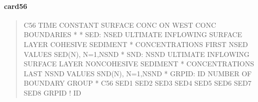 \documentclass[letterpaper,10pt,english]{sphinxmanual}
\begin{document}
\paragraph{card56}
\label{\detokenize{inputfiles/runcontrol/card56:card56}}\label{\detokenize{inputfiles/runcontrol/card56::doc}}\begin{quote}

\begin{sphinxVerbatim}[commandchars=\\\{\}]
\PYGZhy{}\PYGZhy{}\PYGZhy{}\PYGZhy{}\PYGZhy{}\PYGZhy{}\PYGZhy{}\PYGZhy{}\PYGZhy{}\PYGZhy{}\PYGZhy{}\PYGZhy{}\PYGZhy{}\PYGZhy{}\PYGZhy{}\PYGZhy{}\PYGZhy{}\PYGZhy{}\PYGZhy{}\PYGZhy{}\PYGZhy{}\PYGZhy{}\PYGZhy{}\PYGZhy{}\PYGZhy{}\PYGZhy{}\PYGZhy{}\PYGZhy{}\PYGZhy{}\PYGZhy{}\PYGZhy{}\PYGZhy{}\PYGZhy{}\PYGZhy{}\PYGZhy{}\PYGZhy{}\PYGZhy{}\PYGZhy{}\PYGZhy{}\PYGZhy{}\PYGZhy{}\PYGZhy{}\PYGZhy{}\PYGZhy{}\PYGZhy{}\PYGZhy{}\PYGZhy{}\PYGZhy{}\PYGZhy{}\PYGZhy{}\PYGZhy{}\PYGZhy{}\PYGZhy{}\PYGZhy{}\PYGZhy{}\PYGZhy{}\PYGZhy{}\PYGZhy{}\PYGZhy{}\PYGZhy{}\PYGZhy{}\PYGZhy{}\PYGZhy{}\PYGZhy{}\PYGZhy{}\PYGZhy{}\PYGZhy{}\PYGZhy{}\PYGZhy{}\PYGZhy{}\PYGZhy{}\PYGZhy{}\PYGZhy{}\PYGZhy{}\PYGZhy{}\PYGZhy{}\PYGZhy{}\PYGZhy{}
C56 TIME CONSTANT SURFACE CONC ON WEST CONC BOUNDARIES
*
*    SED: NSED ULTIMATE INFLOWING SURFACE LAYER COHESIVE SEDIMENT
*         CONCENTRATIONS  FIRST NSED VALUES SED(N), N=1,NSND
*    SND: NSND ULTIMATE INFLOWING SURFACE LAYER NON\PYGZhy{}COHESIVE SEDIMENT
*         CONCENTRATIONS LAST NSND VALUES SND(N), N=1,NSND
*  GRPID: ID NUMBER OF BOUNDARY GROUP
*
C56      SED1      SED2      SED3      SED4      SED5      SED6      SED7      SED8      GRPID ! ID
\end{sphinxVerbatim}
\end{quote}
\end{document}
